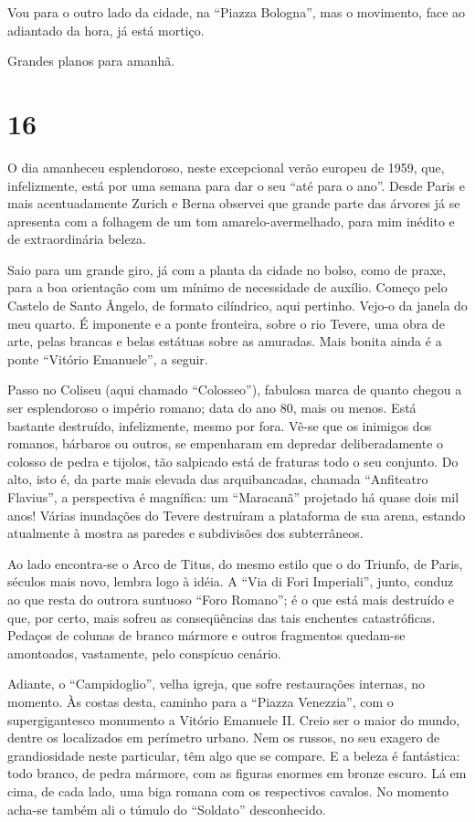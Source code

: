 Vou para o outro lado da cidade, na ``Piazza Bologna'', mas o movimento, face ao adiantado da hora, já está mortiço.

Grandes planos para amanhã.

\section*{16 \adfflatleafright {}}
O dia amanheceu esplendoroso, neste excepcional verão europeu de 1959, que, infelizmente, está por uma semana para dar o seu ``até para o ano''. Desde Paris e mais acentuadamente Zurich e Berna observei que grande parte das árvores já se apresenta com a folhagem de um tom amarelo-avermelhado, para mim inédito e de extraordinária beleza.

Saio para um grande giro, já com a planta da cidade no bolso, como de praxe, para a boa orientação com um mínimo de necessidade de auxílio. Começo pelo Castelo de Santo Ângelo, de formato cilíndrico, aqui pertinho. Vejo-o da janela do meu quarto. É imponente e a ponte fronteira, sobre o rio Tevere, uma obra de arte, pelas brancas e belas estátuas sobre as amuradas. Mais bonita ainda é a ponte ``Vitório Emanuele'', a seguir.

Passo no Coliseu (aqui chamado ``Colosseo''), fabulosa marca de quanto chegou a ser esplendoroso o império romano; data do ano 80, mais ou menos. Está bastante destruído, infelizmente, mesmo por fora. Vê-se que os inimigos dos romanos, bárbaros ou outros, se empenharam em depredar deliberadamente o colosso de pedra e tijolos, tão salpicado está de fraturas todo o seu conjunto. Do alto, isto é, da parte mais elevada das arquibancadas, chamada ``Anfiteatro Flavius'', a perspectiva é magnífica: um ``Maracanã'' projetado há quase dois mil anos! Várias inundações do Tevere destruíram a plataforma de sua arena, estando atualmente à mostra as paredes e subdivisões dos subterrâneos.

Ao lado encontra-se o Arco de Titus, do mesmo estilo que o do Triunfo, de Paris, séculos mais novo, lembra logo à idéia. A ``Via di Fori Imperiali'', junto, conduz ao que resta do outrora suntuoso ``Foro Romano''; é o que está mais destruído e que, por certo, mais sofreu as conseqüências das tais enchentes catastróficas. Pedaços de colunas de branco mármore e outros fragmentos quedam-se amontoados, vastamente, pelo conspícuo cenário.

Adiante, o ``Campidoglio'', velha igreja, que sofre restaurações internas, no momento. Às costas desta, caminho para a ``Piazza Venezzia'', com o supergigantesco monumento a Vitório Emanuele II. Creio ser o maior do mundo, dentre os localizados em perímetro urbano. Nem os russos, no seu exagero de grandiosidade neste particular, têm algo que se compare. E a beleza é fantástica: todo branco, de pedra mármore, com as figuras enormes em bronze escuro. Lá em cima, de cada lado, uma biga romana com os respectivos cavalos. No momento acha-se também ali o túmulo do ``Soldato'' desconhecido.

